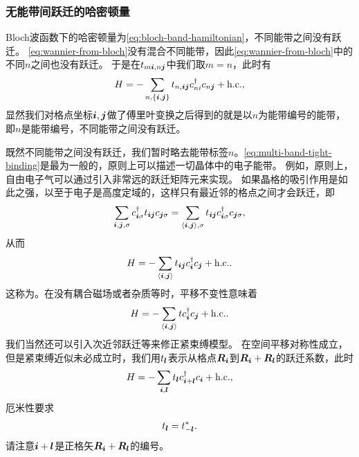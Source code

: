 \subsubsection{无能带间跃迁的哈密顿量} 

Bloch波函数下的哈密顿量为\eqref{eq:bloch-band-hamiltonian}，不同能带之间没有跃迁。
\eqref{eq:wannier-from-bloch}没有混合不同能带，因此\eqref{eq:wannier-from-bloch}中的不同$n$之间也没有跃迁。
于是在$t_{m\vb*{i}, n\vb*{j}}$中我们取$m = n$，此时有
\begin{equation}
    {H} = - \sum_{n, \{\vb*{i}, \vb*{j}\}} t_{n, \vb*{i} \vb*{j}} {c}_{ni}^\dagger {c}_{n \vb*{j}} + \text{h.c.} ,
    \label{eq:multi-band-tight-binding}
\end{equation}
显然我们对格点坐标$\vb*{i}, \vb*{j}$做了傅里叶变换之后得到的就是以$n$为能带编号的能带，即$n$是能带编号，不同能带之间没有跃迁。

既然不同能带之间没有跃迁，我们暂时略去能带标签$n$。\eqref{eq:multi-band-tight-binding}是最为一般的，原则上可以描述一切晶体中的电子能带。
例如，原则上，自由电子气可以通过引入非常远的跃迁矩阵元来实现。
如果晶格的吸引作用是如此之强，以至于电子是高度定域的，这样只有最近邻的格点之间才会跃迁，即
\[
    \sum_{\vb*{i}, \vb*{j}, \sigma} c^\dagger_{\vb*{i} \sigma} t_{\vb*{i} \vb*{j}} c_{\vb*{j} \sigma} = \sum_{\langle \vb*{i}, \vb*{j} \rangle, \sigma} t_{\vb*{i} \vb*{j}} c^\dagger_{\vb*{i} \sigma} c_{\vb*{j} \sigma},
\]
从而
\begin{equation}
    {H} = - \sum_{\langle \vb*{i}, \vb*{j} \rangle} t_{\vb*{i} \vb*{j}} {c}^\dagger_{\vb*{i}} {c}_{\vb*{j}} + \text{h.c.}.
\end{equation}
这称为。在没有耦合磁场或者杂质等时，平移不变性意味着
\begin{equation}
    {H} = - \sum_{\langle \vb*{i}, \vb*{j} \rangle} t {c}^\dagger_{\vb*{i}} {c}_{\vb*{j}} + \text{h.c.}.
\end{equation}
我们当然还可以引入次近邻跃迁等来修正紧束缚模型。
在空间平移对称性成立，但是紧束缚近似未必成立时，我们用$t_{\vb*{l}}$表示从格点$\vb*{R}_{\vb*{i}}$到$\vb*{R}_{\vb*{i}} + \vb*{R}_{\vb*{l}}$的跃迁系数，此时
\begin{equation}
    H = - \sum_{\vb*{i}, \vb*{l}} t_{\vb*{l}} c^\dagger_{\vb*{i}+\vb*{l}} c_{\vb*{i}} + \text{h.c.},
\end{equation}
厄米性要求
\begin{equation}
    t_{\vb*{l}} = t_{-\vb*{l}}^*.
\end{equation}
请注意$\vb*{i}+\vb*{l}$是正格矢$\vb*{R}_{\vb*{i}} + \vb*{R}_{\vb*{l}}$的编号。

